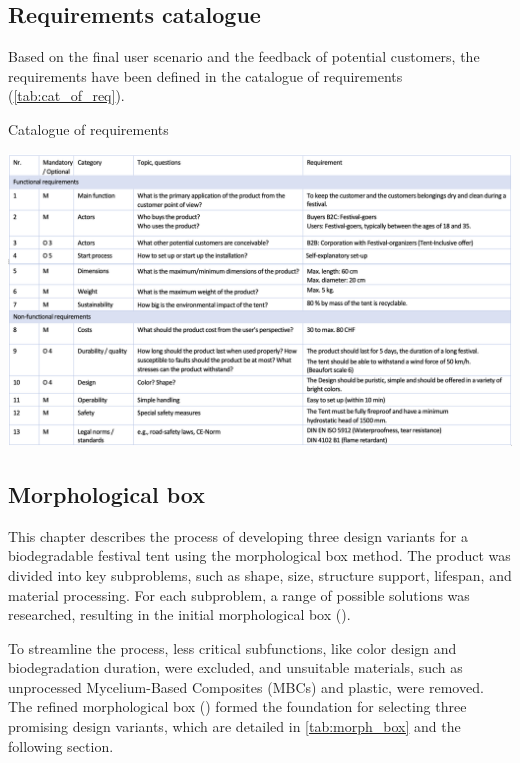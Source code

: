 \documentclass{article}
\begin{document}
\subsection{Requirements catalogue}
Based on the final user scenario and the feedback of potential customers, the requirements
have been defined in the catalogue of requirements (\autoref{tab:cat_of_req}).

\begin{table}[ht!]
    \centering
    \caption{Catalogue of requirements}
    \includegraphics[width=\textwidth]{media/req_cat_high_res.png}
    \label{tab:cat_of_req}
\end{table}

\subsection{Morphological box}
This chapter describes the process of developing three design variants for a biodegradable
festival tent using the morphological box method. The product was divided into key
subproblems, such as shape, size, structure support, lifespan, and material processing.
For each subproblem, a range of possible solutions was researched, resulting in the
initial morphological box ({\color{red}{see Appendix, Table xy}}).

To streamline the process, less critical subfunctions, like color design and biodegradation
duration, were excluded, and unsuitable materials, such as unprocessed Mycelium-Based
Composites (MBCs) and plastic, were removed. The refined morphological box
({\color{red}{see Appendix, Table xy}}) formed the foundation for selecting three
promising design variants, which are detailed in \autoref{tab:morph_box} and the following
section. 
\end{document}
